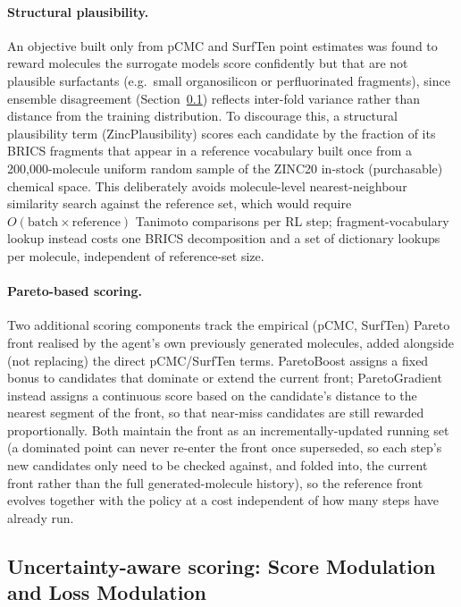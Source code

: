 \documentclass[11pt]{aime}
\begin{document}
\paragraph{Structural plausibility.}
An objective built only from pCMC and SurfTen point estimates was found to reward molecules the surrogate models score confidently but that are not plausible surfactants (e.g.\ small organosilicon or perfluorinated fragments), since ensemble disagreement (Section~\ref{sec:methods:uncertainty}) reflects inter-fold variance rather than distance from the training distribution.
To discourage this, a structural plausibility term (ZincPlausibility) scores each candidate by the fraction of its BRICS\cite{degen_art_2008} fragments that appear in a reference vocabulary built once from a 200{,}000-molecule uniform random sample of the ZINC20 in-stock (purchasable) chemical space\cite{irwin_zinc20_2020}.
This deliberately avoids molecule-level nearest-neighbour similarity search against the reference set, which would require $O(\text{batch}\times\text{reference})$ Tanimoto comparisons per RL step; fragment-vocabulary lookup instead costs one BRICS decomposition and a set of dictionary lookups per molecule, independent of reference-set size.

\paragraph{Pareto-based scoring.}
Two additional scoring components track the empirical (pCMC, SurfTen) Pareto front\cite{deb_fast_2002} realised by the agent's own previously generated molecules, added alongside (not replacing) the direct pCMC/SurfTen terms.
ParetoBoost assigns a fixed bonus to candidates that dominate or extend the current front;
ParetoGradient instead assigns a continuous score based on the candidate's distance to the nearest segment of the front, so that near-miss candidates are still rewarded proportionally.
Both maintain the front as an incrementally-updated running set (a dominated point can never re-enter the front once superseded, so each step's new candidates only need to be checked against, and folded into, the current front rather than the full generated-molecule history), so the reference front evolves together with the policy at a cost independent of how many steps have already run.

\subsection{Uncertainty-aware scoring: Score Modulation and Loss Modulation}
\label{sec:methods:uncertainty}
\end{document}
